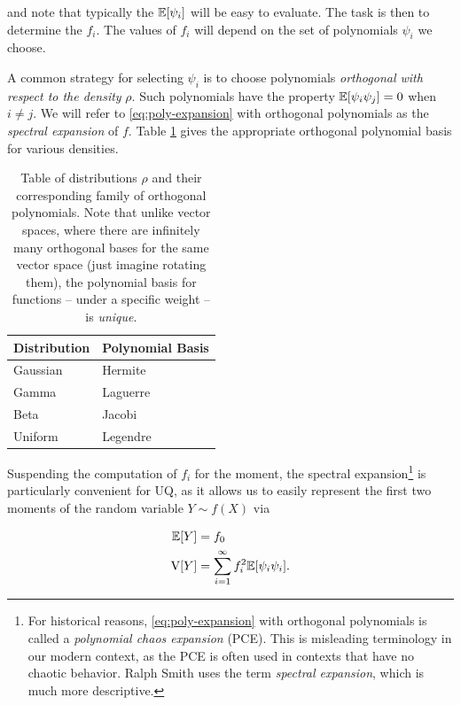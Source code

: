 \documentclass[../primer.tex]{subfiles}
\begin{document}
\noindent and note that typically the $\mathbb{E}[\psi_i]$ will be easy to evaluate. The
task is then to determine the $f_i$. The values of $f_i$ will depend on the set
of polynomials $\psi_i$ we choose.

A common strategy for selecting $\psi_i$ is to choose polynomials
\emph{orthogonal with respect to the density} $\rho$.\cite{xiu2002wiener} Such
polynomials have the property $\mathbb{E}[\psi_i\psi_j] = 0$ when $i\neq j$. We will
refer to \eqref{eq:poly-expansion} with orthogonal polynomials as the
\emph{spectral expansion} of $f$. Table \ref{tab:pce-basis} gives the
appropriate orthogonal polynomial basis for various densities.

\begin{table}[!ht]
  \centering
  \begin{tabular}{@{}ll@{}}
    Distribution & Polynomial Basis \\
    \hline
    Gaussian     & Hermite \\
    Gamma        & Laguerre \\
    Beta         & Jacobi \\
    Uniform      & Legendre
  \end{tabular}
  \caption{Table of distributions $\rho$ and their corresponding family of
    orthogonal polynomials. Note that unlike vector spaces, where there are
    infinitely many orthogonal bases for the same vector space (just imagine
    rotating them), the polynomial basis for functions -- under a specific
    weight -- is \emph{unique}.}
  \label{tab:pce-basis}
\end{table}

Suspending the computation of $f_i$ for the moment, the spectral
expansion\footnote{For historical reasons, \eqref{eq:poly-expansion} with
  orthogonal polynomials is called a \emph{polynomial chaos expansion} (PCE).
  This is misleading terminology in our modern context, as the PCE is often used
  in contexts that have no chaotic behavior. Ralph Smith uses the term
  \emph{spectral expansion}, which is much more descriptive.} is particularly
convenient for UQ, as it allows us to easily represent the first two moments of
the random variable $Y\sim f(X)$ via

\begin{equation} \begin{aligned}
  \mathbb{E}[Y] &= f_0 \\
  \mathrm{V}[Y] &= \sum_{i=1}^{\infty} f_i^2 \mathbb{E}[\psi_i\psi_i].
\end{aligned} \end{equation}
\end{document}
